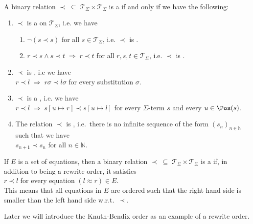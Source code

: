 \begin{Definition} \hspace*{\fill} \\
  A binary relation $\prec \;\subseteq\; \mathcal{T}_\Sigma \times \mathcal{T}_\Sigma$ is a
   if and only if we have the following:
  \begin{enumerate}
  \item $\prec$ is a  on $\mathcal{T}_\Sigma$, i.e. we have
        \begin{enumerate}
        \item $\neg (s \prec s)$ \hspace*{2.6cm} for all $s \in \mathcal{T}_\Sigma$, i.e. $\prec$ is .
        \item $r \prec s \wedge s \prec t \;\Rightarrow\; r \prec t$ \quad for all $r,s,t \in \mathcal{T}_\Sigma$,
              i.e. $\prec$ is . 
        \end{enumerate}
    
  \item $\prec$ is , i.e we have
        \\[0.2cm]
        \hspace*{1.3cm}
        $r \prec l \;\Rightarrow\; r\sigma \prec l\sigma$ \quad for every substitution $\sigma$.
  \item $\prec$ is a , i.e. we have
        \\[0.2cm]
        \hspace*{1.3cm}
        $r \prec l \;\Rightarrow\; s[u \mapsto r] \prec s[u \mapsto l]$ for every $\Sigma$-term $s$ and every
        $u \in\Pos(s)  $.
  \item The relation $\prec$ is , i.e.~there is no infinite sequence of the form
        $(s_n)_{n\in\mathbb{N}}$ such that we have
        \\[-0.2cm]
        \hspace*{1.3cm}
        $s_{n+1} \prec s_n$ \quad for all $n \in \mathbb{N}$. 
  \end{enumerate}
  If $E$ is a set of equations, then a binary relation $\prec \;\subseteq\; \mathcal{T}_\Sigma \times \mathcal{T}_\Sigma$
  is a  if, in addition to being a rewrite order, it satisfies
  \\[0.2cm]
  \hspace*{1.3cm}
  $r \prec l$ \quad for every equation $(l \approx r) \in E$.
  \\[0.2cm]    
  This means that all equations in $E$ are ordered such that the right hand side is smaller than the left
  hand side w.r.t.~$\prec$.    \eod
\end{Definition}
Later we will introduce the Knuth-Bendix order as an example of a rewrite order.

